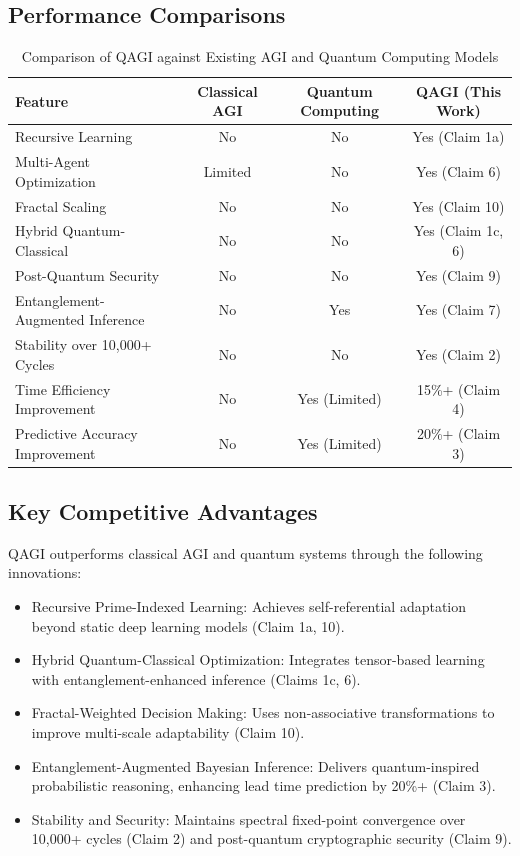 \documentclass{article}
\theoremstyle{plain}
\theoremstyle{claimstyle}
\begin{document}
\subsection{Performance Comparisons}

\begin{table}[h]
    \centering
    \caption{Comparison of QAGI against Existing AGI and Quantum Computing Models}
    \begin{tabular}{|l|c|c|c|}
        \hline
        \textbf{Feature} & \textbf{Classical AGI} & \textbf{Quantum Computing} & \textbf{QAGI (This Work)} \\
        \hline
        Recursive Learning & No & No & Yes (Claim 1a) \\
        \hline
        Multi-Agent Optimization & Limited & No & Yes (Claim 6) \\
        \hline
        Fractal Scaling & No & No & Yes (Claim 10) \\
        \hline
        Hybrid Quantum-Classical & No & No & Yes (Claim 1c, 6) \\
        \hline
        Post-Quantum Security & No & No & Yes (Claim 9) \\
        \hline
        Entanglement-Augmented Inference & No & Yes & Yes (Claim 7) \\
        \hline
        Stability over 10,000+ Cycles & No & No & Yes (Claim 2) \\
        \hline
        Time Efficiency Improvement & No & Yes (Limited) & 15\%+ (Claim 4) \\
        \hline
        Predictive Accuracy Improvement & No & Yes (Limited) & 20\%+ (Claim 3) \\
        \hline
    \end{tabular}
    \label{tab:comparison}
\end{table}

\subsection{Key Competitive Advantages}
QAGI outperforms classical AGI and quantum systems through the following innovations:
\begin{itemize}
    \item Recursive Prime-Indexed Learning: Achieves self-referential adaptation beyond static deep learning models (Claim 1a, 10).
    \item Hybrid Quantum-Classical Optimization: Integrates tensor-based learning with entanglement-enhanced inference (Claims 1c, 6).
    \item Fractal-Weighted Decision Making: Uses non-associative transformations to improve multi-scale adaptability (Claim 10).
    \item Entanglement-Augmented Bayesian Inference: Delivers quantum-inspired probabilistic reasoning, enhancing lead time prediction by 20\%+ (Claim 3).
    \item Stability and Security: Maintains spectral fixed-point convergence over 10,000+ cycles (Claim 2) and post-quantum cryptographic security (Claim 9).
\end{itemize}
\end{document}
